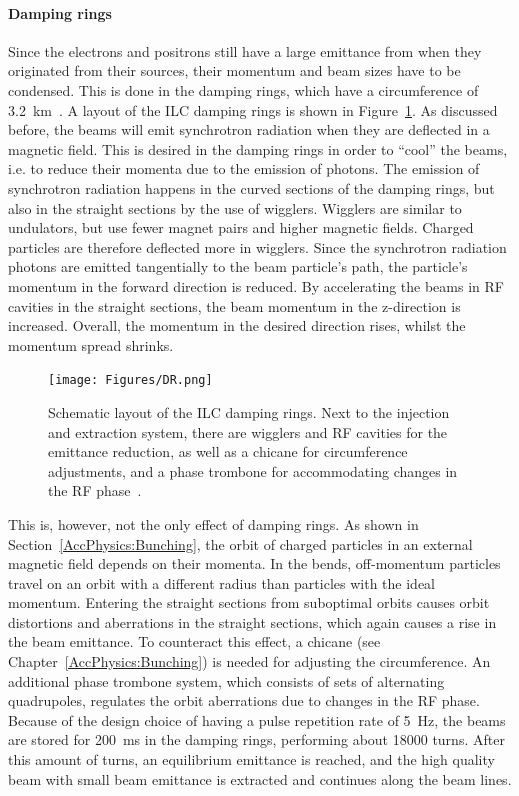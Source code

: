\paragraph{Damping rings}
Since the electrons and positrons still have a large emittance from when they originated from their sources, their momentum and beam sizes have to be condensed.
This is done in the damping rings, which have a circumference of \SI{3.2}{\kilo\meter}~\cite[p. 14]{TDR32}.
A layout of the ILC damping rings is shown in Figure~\ref{fig:DR}.
As discussed before, the beams will emit synchrotron radiation when they are deflected in a magnetic field.
This is desired in the damping rings in order to ``cool'' the beams, i.e. to reduce their momenta due to the emission of photons.
The emission of synchrotron radiation happens in the curved sections of the damping rings, but also in the straight sections by the use of wigglers.
Wigglers are similar to undulators, but use fewer magnet pairs and higher magnetic fields.
Charged particles are therefore deflected more in wigglers.
Since the synchrotron radiation photons are emitted tangentially to the beam particle's path, the particle's momentum in the forward direction is reduced.
By accelerating the beams in RF cavities in the straight sections, the beam momentum in the z-direction is increased.
Overall, the momentum in the desired direction rises, whilst the momentum spread shrinks.
\begin{figure}
\centering
\texttt{[image: Figures/DR.png]}
\caption[ILC damping ring layout]{Schematic layout of the ILC damping rings.
Next to the injection and extraction system, there are wigglers and RF cavities for the emittance reduction, as well as a chicane for circumference adjustments, and a phase trombone for accommodating changes in the RF phase~\cite[p. 15]{TDR32}.}
\label{fig:DR}
\end{figure}

This is, however, not the only effect of damping rings.
As shown in Section~\ref{AccPhysics:Bunching}, the orbit of charged particles in an external magnetic field depends on their momenta.
In the bends, off-momentum particles travel on an orbit with a different radius than particles with the ideal momentum.
Entering the straight sections from suboptimal orbits causes orbit distortions and aberrations in the straight sections, which again causes a rise in the beam emittance.
To counteract this effect, a chicane (see Chapter~\ref{AccPhysics:Bunching}) is needed for adjusting the circumference.
An additional phase trombone system, which consists of sets of alternating quadrupoles, regulates the orbit aberrations due to changes in the RF phase.
Because of the design choice of having a pulse repetition rate of \SI{5}{\hertz}, the beams are stored for \SI{200}{\milli\second} in the damping rings, performing about \num{18000} turns.
After this amount of turns, an equilibrium emittance is reached, and the high quality beam with small beam emittance is extracted and continues along the beam lines.

